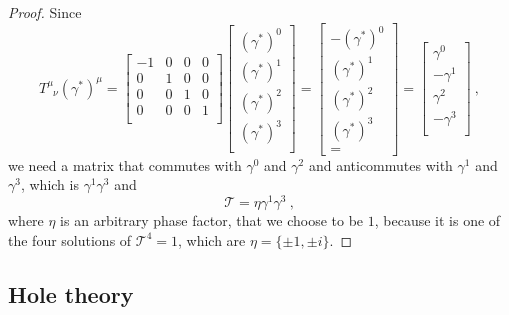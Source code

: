 \begin{proof}
        Since 
        \begin{equation*}
            T^\mu_{\phantom \mu \nu} (\gamma^*)^\mu = \begin{bmatrix}
                - 1 & 0 & 0 & 0 \\
                0 & 1 & 0 & 0 \\
                0 & 0 & 1 & 0 \\
                0 & 0 & 0 & 1 \\
            \end{bmatrix} \begin{bmatrix}
                (\gamma^*)^0 \\ (\gamma^*)^1 \\ (\gamma^*)^2 \\ (\gamma^*)^3 \\
            \end{bmatrix} = \begin{bmatrix}
                - (\gamma^*)^0 \\ (\gamma^*)^1 \\ (\gamma^*)^2 \\ (\gamma^*)^3 \\ = 
            \end{bmatrix} = \begin{bmatrix}
                \gamma^0 \\ -\gamma^1 \\ \gamma^2 \\ - \gamma^3 \\ 
            \end{bmatrix} ~,
        \end{equation*}
            we need a matrix that commutes with $\gamma^0$ and $\gamma^2$ and anticommutes with $\gamma^1$ and $\gamma^3$, which is $\gamma^1 \gamma^3$ and 
        \begin{equation*}
            \mathcal T = \eta \gamma^1 \gamma^3~,
        \end{equation*}
        where $\eta$ is an arbitrary phase factor, that we choose to be $1$, because it is one of the four solutions of $\mathcal T^4 = 1$, which are $\eta = \{\pm 1, \pm i\}$.
    \end{proof}

\subsection{Hole theory}

